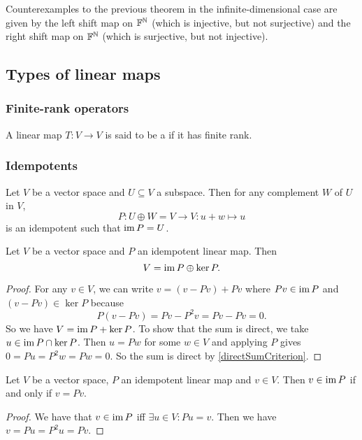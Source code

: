 \begin{example}
Counterexamples to the previous theorem in the infinite-dimensional case are given by the left shift map on $\mathbb{F}^{\mathbb{N}}$ (which is injective, but not surjective) and the right shift map on $\mathbb{F}^{\mathbb{N}}$ (which is surjective, but not injective).
\end{example}


\subsection{Types of linear maps}
\subsubsection{Finite-rank operators}
\begin{definition}
A linear map $T: V\to V$ is said to be a  if it has finite rank.
\end{definition}
\subsubsection{Idempotents}

\begin{lemma}
Let $V$ be a vector space and $U\subseteq V$ a subspace. Then for any complement $W$ of $U$ in $V$,
\[ P: U\oplus W = V \to V: u+w \mapsto u \]
is an idempotent such that $\operatorname{im} P = U$.
\end{lemma}

\begin{proposition} \label{directSumKernelImageIdempotent}
Let $V$ be a vector space and $P$ an idempotent linear map. Then
\[ V = \operatorname{im} P \oplus \ker P. \]
\end{proposition}
\begin{proof}
For any $v\in V$, we can write $v= (v-Pv)+Pv$ where $Pv\in \operatorname{im} P$ and $(v-Pv)\in \ker P$ because
\[ P(v-Pv) = Pv- P^2v = Pv - Pv = 0. \]
So we have $V = \operatorname{im} P + \ker P$. To show that the sum is direct, we take $u\in \operatorname{im} P \cap \ker P$. Then $u = Pw$ for some $w\in V$ and applying $P$ gives $0 = Pu = P^2w = Pw = 0$. So the sum is direct by \ref{directSumCriterion}.
\end{proof}

\begin{lemma} \label{idempotentImageEquivalence}
Let $V$ be a vector space, $P$ an idempotent linear map and $v\in V$. Then $v\in \operatorname{im} P$ \textup{if and only if} $v = Pv$.
\end{lemma}
\begin{proof}
We have that $v\in \operatorname{im} P$ iff $\exists u\in V: Pu = v$. Then we have $v = Pu = P^2u = Pv$.
\end{proof}

